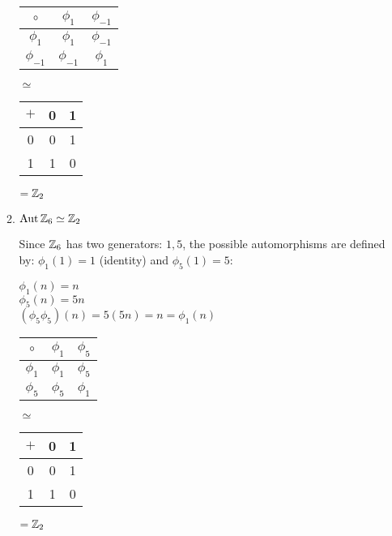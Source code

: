 \documentclass[letterpaper,12pt,fleqn]{article}
\newcommand{\p}{\phi}
\newcommand{\aut}[1]{\operatorname{Aut}{#1}}
\newcommand{\iso}{\simeq}
\begin{document}
\begin{enumerate}[label=\alph*)]
\begin{enumerate}[label=\arabic*)]
    \begin{minipage}[t]{1.5in}
      \begin{tabular}{c|cc}
        $\circ$ & $\p_1$ & $\p_{-1}$ \\
        \hline
        $\p_1$ & $\p_1$ & $\p_{-1}$ \\
        $\p_{-1}$ & $\p_{-1}$ & $\p_1$ \\
      \end{tabular}
    \end{minipage}
    \begin{minipage}{0.4in}
      $\iso$
    \end{minipage}
    \begin{minipage}[t]{1in}
      \begin{tabular}{c|cc}
        $+$ & 0 & 1 \\
        \hline
        0 & 0 & 1 \\
        1 & 1 & 0 \\
      \end{tabular}
    \end{minipage}
    \begin{minipage}{0.4in}
      $=\mathbb{Z}_2$
    \end{minipage}

    \bigskip

  \item $\aut{\Z_6}\iso\Z_2$

    Since $\mathbb{Z}_6$ has two generators: $1,5$, the possible automorphisms are
    defined by: $\p_1(1)=1$ (identity) and $\p_5(1)=5$:
    
    $\p_1(n)=n$ \\
    $\p_5(n)=5n$ \\
    $(\p_5\p_5)(n)=5(5n)=n=\p_1(n)$

    \begin{minipage}[t]{1.5in}
      \begin{tabular}{c|cc}
        $\circ$ & $\p_1$ & $\p_5$ \\
        \hline
        $\p_1$ & $\p_1$ & $\p_5$ \\
        $\p_5$ & $\p_5$ & $\p_1$ \\
      \end{tabular}
    \end{minipage}
    \begin{minipage}{0.4in}
      $\iso$
    \end{minipage}
    \begin{minipage}[t]{1in}
      \begin{tabular}{c|cc}
        $+$ & 0 & 1 \\
        \hline
        0 & 0 & 1 \\
        1 & 1 & 0 \\
      \end{tabular}
    \end{minipage}
    \begin{minipage}{0.4in}
      $=\mathbb{Z}_2$
    \end{minipage}


\end{enumerate}
\end{enumerate}
\end{document}
